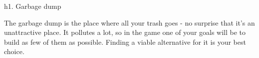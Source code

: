 h1. Garbage dump

The garbage dump is the place where all your trash goes - no surprise that it's an unattractive place. It pollutes a lot, so in the game one of your goals will be to build as few of them as possible. Finding a viable alternative for it is your best choice.